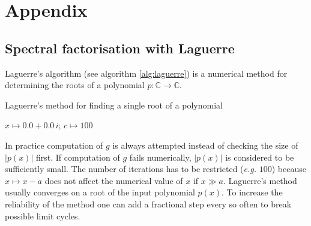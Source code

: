 \documentclass[a4paper,12pt]{book}
\begin{document}
\appendix
\chapter{Appendix}
\section{Spectral factorisation with Laguerre}\label{cha:laguerre}
Laguerre's algorithm (see algorithm \ref{alg:laguerre}) is a numerical
method for determining the roots of a polynomial $p:\mathbb{C}\to\mathbb{C}$. 
\begin{algorithm}[tbhp]
  \caption{Laguerre's method for finding a single root of
    a polynomial\cite{Refworks:406}\label{alg:laguerre}}
  $x\mapsto 0.0+0.0\,i$; $c\mapsto 100$\;
\end{algorithm}
In practice computation of $g$ is always attempted instead of checking the
size of $\left|p(x)\right|$ first. If computation of $g$ fails
numerically, $\left|p(x)\right|$ is considered to be sufficiently small.
The number of iterations has to be restricted (\emph{e.g.} $100$) because
$x\mapsto x-a$ does not affect the numerical value of $x$ if $x\gg a$.
Laguerre's method usually converges on a root of the input polynomial
$p(x)$. To increase the reliability of the method one can add a fractional
step every so often to break possible limit cycles\cite{Refworks:406}.



\end{document}
